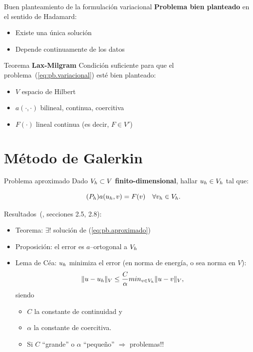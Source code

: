 \documentclass[9pt,leqno]{beamer}
\begin{document}
\begin{frame}{Buen planteamiento de la formulación variacional}
  \textbf{Problema bien planteado} en el sentido de Hadamard:
  \begin{itemize}
  \item Existe una única solución
  \item Depende continuamente de los datos
  \end{itemize}

  \begin{block}{Teorema \textbf{Lax-Milgram}}
    Condición suficiente para que el
    problema~(\ref{eq:pb.variacional}) esté bien planteado:
    \begin{itemize}
    \item $V$ espacio de Hilbert
    \item $a(\cdot,\cdot)$ bilineal, continua, coercitiva
    \item $F(\cdot)$ lineal continua (es decir, $F\in V'$)
    \end{itemize}
  \end{block}
\end{frame}

\section{Método de Galerkin}
\label{sec:buen-plant-de-1}

\begin{frame}{Problema aproximado}
  Dado $\Vh\subset V$ \textbf{finito-dimensional}, hallar $\uh\in\Vh$ tal que:
  \begin{block}{}
    \vspace{-2.5ex}
    \begin{equation}
      \label{eq:pb.aproximado}
      \tag{$P_h$}
      a(\uh,v)= F(v) \quad \forall \vh \in \Vh.
    \end{equation}
  \end{block}
  Resultados~(\cite{Brenner-Scott:08}, secciones 2.5, 2.8):
  \begin{itemize}
  \item Teorema: $\exists!$ solución de (\ref{eq:pb.aproximado})
  \item Proposición: el error es $a$--ortogonal a $\Vh$
  \item Lema de Céa: $\uh$ minimiza el error (en norma de energía, o
    sea norma en $V$):
    $$\norm[V]{u-\uh} \le \frac{C}{\alpha} min_{v\in\Vh}\norm[V]{u-v},$$
    siendo
    \begin{itemize}
    \item $C$ la constante de continuidad y
    \item $\alpha$ la constante de coercitiva.
    \item Si $C$ ``grande'' o $\alpha$ ``pequeño'' $\Rightarrow$ problemas!!
    \end{itemize}
  \end{itemize}
\end{frame}
\end{document}
